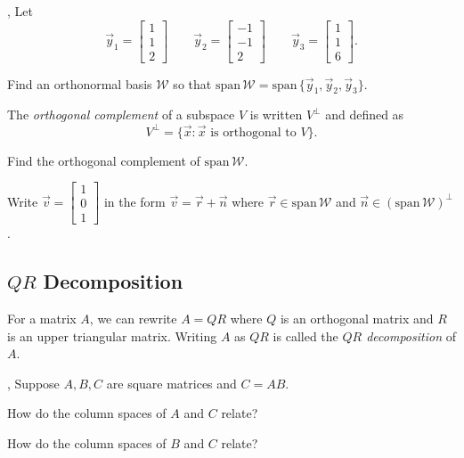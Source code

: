 \documentclass[letter]{article}
\renewcommand{\span}{\mathrm{span}\,}
\newcommand{\mat}[1]{\begin{bmatrix}#1\end{bmatrix}}
\begin{document}
	\sep
	Let
	\[
		\vec y_1=\mat{1\\1\\2}\qquad 
		\vec y_2=\mat{-1\\-1\\2}\qquad
		\vec y_3=\mat{1\\1\\6}.
	\]
	\begin{Enum}
		\item Find an orthonormal basis $\mathcal W$ so that $\span\mathcal W=
			\span\{\vec y_1,\vec y_2,\vec y_3\}$.
	\end{Enum}

	\begin{Def}
		The \emph{orthogonal complement} of a subspace $V$ is written
		$V^\perp$ and defined as
		\[
			V^\perp=\{\vec x:\vec x\text{ is orthogonal to }V\}.
		\]
		\vspace{-.2in}
	\end{Def}

	\begin{Enum}[resume]
		\item Find the orthogonal complement of $\span \mathcal W$.
		\item Write $\vec v=\mat{1\\0\\1}$ in the form $\vec v=\vec r+\vec n$ where 
			$\vec r\in\span\mathcal W$ and $\vec n\in(\span \mathcal W)^\perp$.
	\end{Enum}


\subsection*{$QR$ Decomposition}

	\begin{Def}
		For a matrix $A$, we can rewrite $A=QR$ where $Q$ is an
		orthogonal matrix and $R$ is an upper triangular matrix.  Writing
		$A$ as $QR$ is called the \emph{$QR$ decomposition} of $A$.
	\end{Def}

	\sep
	Suppose $A,B,C$ are square matrices and $C=AB$.
	\begin{Enum}
		\item How do the column spaces of $A$ and $C$ relate?
		\item How do the column spaces of $B$ and $C$ relate?
	\end{Enum}
\end{document}

